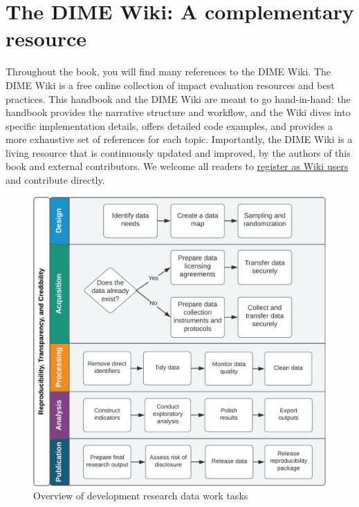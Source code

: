 \documentclass[]{tufte-book}
\begin{document}

\hypertarget{the-dime-wiki-a-complementary-resource}{%
\section*{The DIME Wiki: A complementary
resource}\label{the-dime-wiki-a-complementary-resource}}

Throughout the book, you will find many references to the DIME Wiki. The
DIME Wiki is a free online collection of impact evaluation resources and
best practices. This handbook and the DIME Wiki are meant to go
hand-in-hand: the handbook provides the narrative structure and
workflow, and the Wiki dives into specific implementation details,
offers detailed code examples, and provides a more exhaustive set of
references for each topic. Importantly, the DIME Wiki is a living
resource that is continuously updated and improved, by the authors of
this book and external contributors. We welcome all readers to
\href{https://dimewiki.worldbank.org/New_Users}{register as Wiki users}
and contribute directly.

\begin{figure}
\centering
\includegraphics{../diagrams/Introduction.png}
\caption{Overview of development research data work tasks}
\end{figure}
\end{document}
